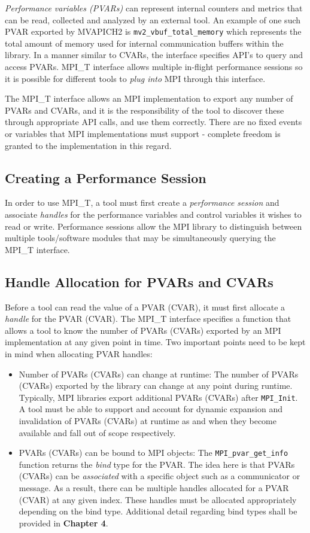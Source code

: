 \textit{Performance variables (PVARs)} can represent internal counters and metrics that can be read, collected and analyzed by an external tool. An example of one such PVAR exported by MVAPICH2 is \verb+mv2_vbuf_total_memory+ which represents the total amount of memory used for internal communication buffers within the library. In a manner similar to CVARs, the interface specifies API's to query and access PVARs. MPI\_T interface allows multiple in-flight performance sessions so it is possible for different tools to \emph{plug into} MPI through this interface. \par
The MPI\_T interface allows an MPI implementation to export any number of PVARs and CVARs, and it is the responsibility of the tool to discover these through appropriate API calls, and use them correctly. There are no fixed events or variables that MPI implementations must support - complete freedom is granted to the implementation in this regard.

\subsection{Creating a Performance Session}
In order to use MPI\_T, a tool must first create a \emph{performance session} and associate \emph{handles} for the performance variables and control variables it wishes to read or write. Performance sessions allow the MPI library to distinguish between multiple tools/software modules that may be simultaneously querying the MPI\_T interface.

\subsection{Handle Allocation for PVARs and CVARs}
Before a tool can read the value of a PVAR (CVAR), it must first allocate a \emph{handle} for the PVAR (CVAR). The MPI\_T interface specifies a function that allows a tool to know the number of PVARs (CVARs) exported by an MPI implementation at any given point in time. Two important points need to be kept in mind when allocating PVAR handles:
\begin{itemize}
	\item Number of PVARs (CVARs) can change at runtime: The number of PVARs (CVARs) exported by the library can change at any point during runtime. Typically, MPI libraries export additional PVARs (CVARs) after \verb+MPI_Init+. A tool must be able to support and account for dynamic expansion and invalidation of PVARs (CVARs) at runtime as and when they become available and fall out of scope respectively.
	\item PVARs (CVARs) can be bound to MPI objects: The \verb+MPI_pvar_get_info+ function returns the \emph{bind} type for the PVAR. The idea here is that PVARs (CVARs) can be \emph{associated} with a specific object such as a communicator or message. As a result, there can be multiple handles allocated for a PVAR (CVAR) at any given index. These handles must be allocated appropriately depending on the bind type. Additional detail regarding bind types shall be provided in \textbf{Chapter 4}.
\end{itemize}

